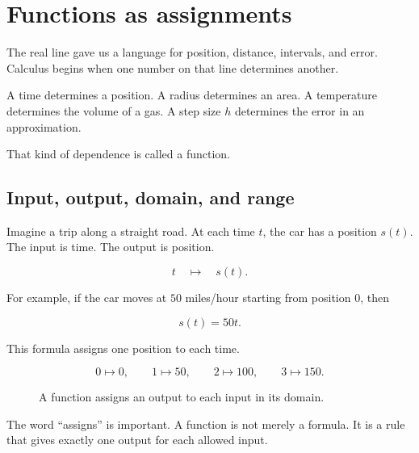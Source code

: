 \section{Functions as assignments}
\label{sec:functions-as-assignments}

The real line gave us a language for position, distance, intervals, and error. Calculus begins when one number on that line determines another.

A time determines a position. A radius determines an area. A temperature determines the volume of a gas. A step size \(h\) determines the error in an approximation.

That kind of dependence is called a function.

\subsection{Input, output, domain, and range}
\label{subsec:input-output-domain-range}

Imagine a trip along a straight road. At each time \(t\), the car has a position \(s(t)\). The input is time. The output is position.

\[
t \quad \longmapsto \quad s(t).
\]

For example, if the car moves at \(50\) miles/hour starting from position \(0\), then

\[
s(t)=50t.
\]

This formula assigns one position to each time.

\[
0\mapsto 0,\qquad
1\mapsto 50,\qquad
2\mapsto 100,\qquad
3\mapsto 150.
\]

\begin{figure}[h]
\centering
{}
\caption{A function assigns an output to each input in its domain.}
\label{fig:function-assignment}
\end{figure}

The word ``assigns'' is important. A function is not merely a formula. It is a rule that gives exactly one output for each allowed input.

